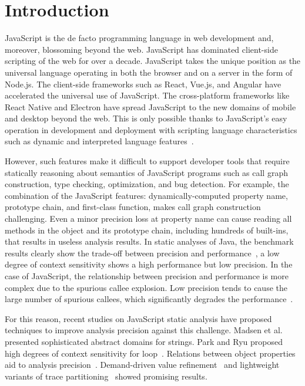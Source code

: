 \section{Introduction}\label{sec:intro}
JavaScript is the de facto programming language in web development and,
moreover, blossoming beyond the web.
JavaScript has dominated client-side scripting of the web for over a decade.
JavaScript takes the unique position as the universal language operating in both
the browser and on a server in the form of Node.js.
The client-side frameworks such as React, Vue.js, and Angular have accelerated
the universal use of JavaScript.
The cross-platform frameworks like React Native and Electron have spread
JavaScript to the new domains of mobile and desktop beyond the web.
This is only possible thanks to JavaScript's easy operation in development and
deployment with scripting language characteristics such as dynamic and
interpreted language features~\cite{weakly}.


However, such features make it difficult to support developer tools that require
statically reasoning about semantics of JavaScript programs such as call graph
construction, type checking, optimization, and bug detection.
For example, the combination of the JavaScript features: dynamically-computed
property name, prototype chain, and first-class function, makes call graph
construction challenging.
Even a minor precision loss at property name can cause reading all methods in
the object and its prototype chain, including hundreds of built-ins, that
results in useless analysis results.
In static analyses of Java, the benchmark results clearly show the trade-off
between precision and performance~\cite{}, a low degree of context sensitivity
shows a high performance but low precision.
In the case of JavaScript, the relationship between precision and performance is
more complex due to the spurious callee explosion.
Low precision tends to cause the large number of spurious callees, which
significantly degrades the performance~\cite{}.


For this reason, recent studies on JavaScript static analysis have proposed
techniques to improve analysis precision against this challenge.
Madsen et al.~\cite{} presented sophisticated abstract domains for strings.
Park and Ryu proposed high degrees of context sensitivity for loop~\cite{}.
Relations between object properties aid to analysis precision~\cite{}.
Demand-driven value refinement~\cite{} and lightweight variants of trace
partitioning~\cite{} showed promising results.


